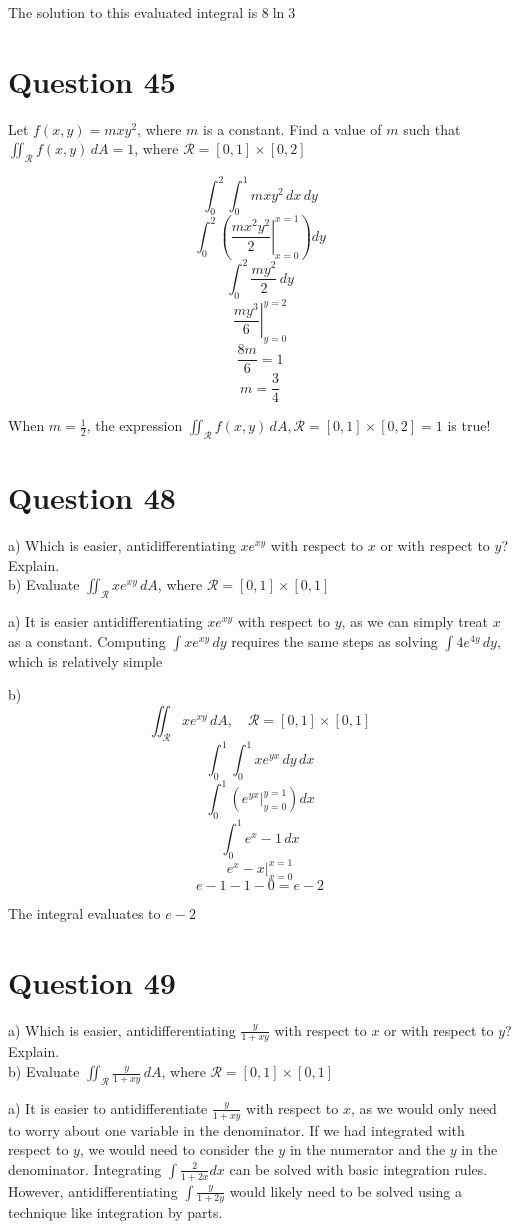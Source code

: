 \documentclass[hidelinks]{article}
\begin{document}
The solution to this evaluated integral is $8\ln 3$
\newpage
\section{Question 45}
Let $f(x, y) = mxy^2$, where $m$ is a constant. Find a value of $m$ such that $\iint_{\mathcal{R}} f(x, y) \, dA = 1$, where $\mathcal{R} = [0,1] \times [0,2]$

\[
	\int_0^2 \int_0^1 mxy^2 \,dx\,dy 
\]
\[
	\int_0^2 \left ( \left . \frac{mx^2y^2}{2} \right |_{x = 0}^{x = 1} \right )dy 
\]
\[
	\int_0^2 \frac{my^2}{2}\,dy 
\]
\[
	\left. \frac{my^3}{6} \right |_{y = 0}^{y = 2} 
\]
\[
	\frac{8m}{6} = 1
\]
\[
	m = \frac{3}{4}
\]

When $m = \frac{1}{2}$, the expression $\iint_{\mathcal{R}} f(x, y) \, dA, \mathcal{R} = [0,1] \times [0,2] = 1$ is true! 

\newpage
\section{Question 48}
a) Which is easier, antidifferentiating $xe^{xy}$ with respect to $x$ or with respect to $y$? Explain.\\
b) Evaluate $\iint_{\mathcal{R}} xe^{xy} \, dA$, where $\mathcal{R} = [0,1] \times [0,1]$

a) It is easier antidifferentiating $xe^{xy}$ with respect to $y$, as we can simply treat $x$ as a constant. Computing $\int xe^{xy} \, dy$ requires the same steps as solving $\int 4e^{4y}\,dy$, which is relatively simple

b)
\[
	\iint_{\mathcal{R}} xe^{xy} \, dA, \quad \mathcal{R} = [0,1] \times [0,1]
\]
\[
	\int_0^1 \int_0^1 xe^{yx} \,dy \, dx
\]
\[
	\int_0^1 \left(e^{yx} \Big |_{y = 0}^{y = 1}\right)dx
\]
\[
	\int_0^1 e^{x} - 1\,dx
\]
\[
	e^x - x \Big |_{x = 0}^{x = 1}
\]
\[
	e - 1 - 1 - 0 = e -2
\]

The integral evaluates to $e-2$


\newpage
\section{Question 49}
a) Which is easier, antidifferentiating $\frac{y}{1+xy}$ with respect to $x$ or with respect to $y$? Explain.\\
b) Evaluate $\iint_{\mathcal{R}} \frac{y}{1+xy} \, dA$, where $\mathcal{R} = [0,1] \times [0,1]$

a) It is easier to antidifferentiate $\frac{y}{1+xy}$ with respect to $x$, as we would only need to worry about one variable in the denominator. If we had integrated with respect to $y$, we would need to consider the $y$ in the numerator and the $y$ in the denominator. Integrating $\int \frac{2}{1+2x} dx$ can be solved with basic integration rules. However, antidifferentiating $\int \frac{y}{1+2y}$ would likely need to be solved using a technique like integration by parts. 
\end{document}
